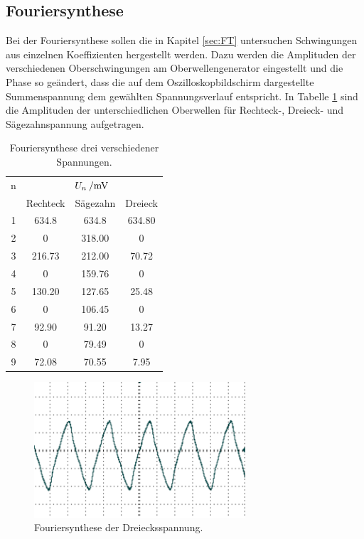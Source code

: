 \subsection{Fouriersynthese}
Bei der Fouriersynthese sollen die in Kapitel \ref{sec:FT} untersuchen Schwingungen aus einzelnen Koeffizienten hergestellt werden. Dazu werden die Amplituden der verschiedenen Oberschwingungen am Oberwellengenerator eingestellt und die Phase so geändert, dass die auf dem Oszilloskopbildschirm dargestellte Summenspannung dem gewählten Spannungsverlauf entspricht. In Tabelle \ref{tab:FS} sind die Amplituden der unterschiedlichen Oberwellen für Rechteck-, Dreieck- und Sägezahnspannung aufgetragen.

\begin{table}
	\centering
	\begin{tabular}{cccc}	
	\toprule
\multicolumn{1}{c}{n} & \multicolumn{3}{c}{$U_n\:/\si{\milli{\volt}}$}\\
	{} & {Rechteck} & {Sägezahn} & {Dreieck}\\
	\midrule
 1 & 634.8  & 634.8  & 634.80\\
 2 &   0    & 318.00 &   0\\
 3 & 216.73 & 212.00 &  70.72\\
 4 &   0    & 159.76 &   0\\
 5 & 130.20 & 127.65 &  25.48\\
 6 &   0    & 106.45 &   0\\
 7 &  92.90 &  91.20 &  13.27\\
 8 &   0    &  79.49 &   0\\
 9 &  72.08 &  70.55 &  7.95\\
	\bottomrule
	\end{tabular}
	\caption{Fouriersynthese drei verschiedener Spannungen.}
	\label{tab:FS}
\end{table}






\begin{figure}
	\centering
		\includegraphics[width=0.7\textwidth]{Bilder/1-9_DE.pdf}		
\caption{Fouriersynthese der Dreiecksspannung.}
	\label{fig:1-9_DE}
\end{figure}

